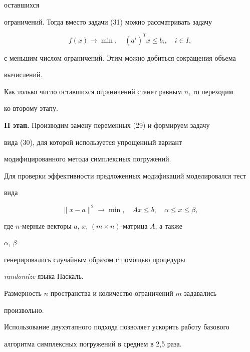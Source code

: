 оставшихся


ограничений. Тогда вместо задачи (31) можно рассматривать задачу


\begin{equation}


f(x)\to\min,\quad (a^i)^Tx\le b_i,\quad i\in I,


\end{equation}


с меньшим числом ограничений. Этим можно добиться сокращения объема


вычислений.





Как только число оставшихся ограничений станет равным $n$, то переходим


ко второму этапу.





{\bf II этап.} Производим замену переменных (29) и формируем задачу


вида (30), для которой используется упрощенный вариант


модифицированного метода симплексных погружений.





Для проверки эффективности предложенных модификаций моделировался тест


вида


$$


\|x-a\|^2\to\min,\quad Ax\le b,\quad \alpha\le x\le\beta,


$$


где $n$-мерные векторы $a$, $x$, $(m\times n)$-матрица $A$, а также


$\alpha$, $\beta$


генерировались случайным образом с помощью процедуры


{\it randomize} языка Паскаль.


Размерность $n$ пространства и количество ограничений $m$ задавались


произвольно.





Использование двухэтапного подхода позволяет ускорить работу базового


алгоритма симплексных погружений в среднем в 2,5 раза.





